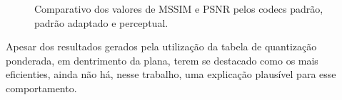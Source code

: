 \begin{figure}[!ht]\label{MSSIM_fase2}
\caption{Comparativo dos valores de MSSIM e PSNR pelos codecs padrão, padrão adaptado e perceptual.}
\end{figure}

Apesar dos resultados gerados pela utilização da tabela de quantização ponderada, em dentrimento da plana, terem se destacado como os mais eficienties, ainda não há, nesse trabalho, uma explicação plausível para esse comportamento.